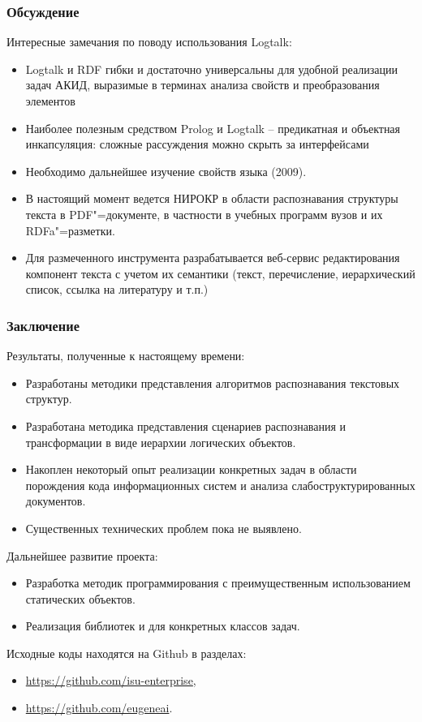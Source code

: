 \documentclass[10pt]{beamer}
\begin{document}
\begin{frame}
  \frametitle{Обсуждение}
  Интересные замечания по поводу использования Logtalk:
  \begin{itemize}
  \item Logtalk и RDF гибки и достаточно универсальны для удобной реализации задач АКИД, выразимые в терминах анализа свойств и преобразования элементов
  \item Наиболее полезным средством Prolog и Logtalk -- предикатная и объектная инкапсуляция: сложные рассуждения можно скрыть за интерфейсами
  \item Необходимо дальнейшее изучение свойств языка (2009).
  \end{itemize}

  \begin{itemize}
  \item {\color{mymauve} В настоящий момент ведется НИРОКР в области распознавания структуры текста в PDF"=документе, в частности в учебных программ вузов и их RDFa"=разметки.}
  \item {\color{mymauve} Для размеченного инструмента разрабатывается веб-сервис редактирования компонент текста с учетом их семантики (текст, перечисление, иерархический список, ссылка на литературу и т.п.)}
  \end{itemize}
\end{frame}

\begin{frame}
  \frametitle{Заключение}
  Результаты, полученные к настоящему времени:
  \begin{itemize}
  \item Разработаны методики представления алгоритмов распознавания текстовых структур.
  \item Разработана методика представления сценариев распознавания и трансформации в виде иерархии логических объектов.
  \item Накоплен некоторый опыт реализации конкретных задач в области порождения кода информационных систем и анализа слабоструктурированных документов.
  \item Существенных технических проблем пока не выявлено.
  \end{itemize}
  Дальнейшее развитие проекта:
  \begin{itemize}
  \item Разработка методик программирования с преимущественным использованием статических объектов.
  \item Реализация библиотек и для конкретных классов задач.
  \end{itemize}
  Исходные коды находятся на Github в разделах:
  \begin{itemize}
  \item \url{https://github.com/isu-enterprise},
  \item \url{https://github.com/eugeneai}.
  \end{itemize}
\end{frame}
\end{document}
